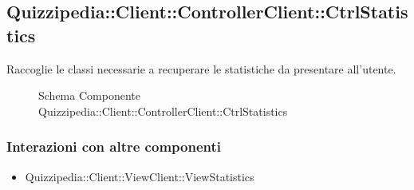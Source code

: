 \subsection{Quizzipedia::Client::ControllerClient::CtrlStatistics}
Raccoglie le classi necessarie a recuperare le statistiche da presentare all'utente.
\begin{figure}[H]
\centering
\noindent{}
\caption[Schema Componente Quizzipedia::Client::ControllerClient::CtrlStatistics]{Schema Componente Quizzipedia::Client::ControllerClient::CtrlStatistics}
\end{figure}
\subsubsection{Interazioni con altre componenti}
\begin{itemize}
\item Quizzipedia::Client::ViewClient::ViewStatistics
\end{itemize}
